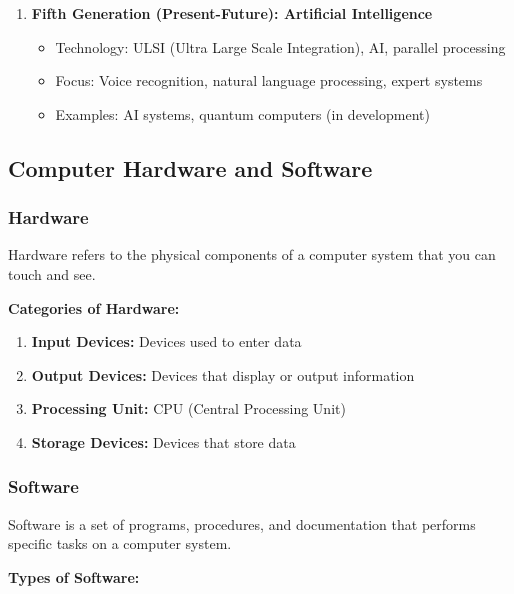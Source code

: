 \documentclass[12pt,a4paper]{article}
\begin{document}
\begin{enumerate}
    \item \textbf{Fifth Generation (Present-Future): Artificial Intelligence}
    \begin{itemize}
        \item Technology: ULSI (Ultra Large Scale Integration), AI, parallel processing
        \item Focus: Voice recognition, natural language processing, expert systems
        \item Examples: AI systems, quantum computers (in development)
    \end{itemize}
\end{enumerate}

\subsection{Computer Hardware and Software}

\subsubsection{Hardware}
Hardware refers to the physical components of a computer system that you can touch and see.

\textbf{Categories of Hardware:}
\begin{enumerate}
    \item \textbf{Input Devices:} Devices used to enter data
    \item \textbf{Output Devices:} Devices that display or output information
    \item \textbf{Processing Unit:} CPU (Central Processing Unit)
    \item \textbf{Storage Devices:} Devices that store data
\end{enumerate}

\subsubsection{Software}
Software is a set of programs, procedures, and documentation that performs specific tasks on a computer system.

\textbf{Types of Software:}
\end{document}
